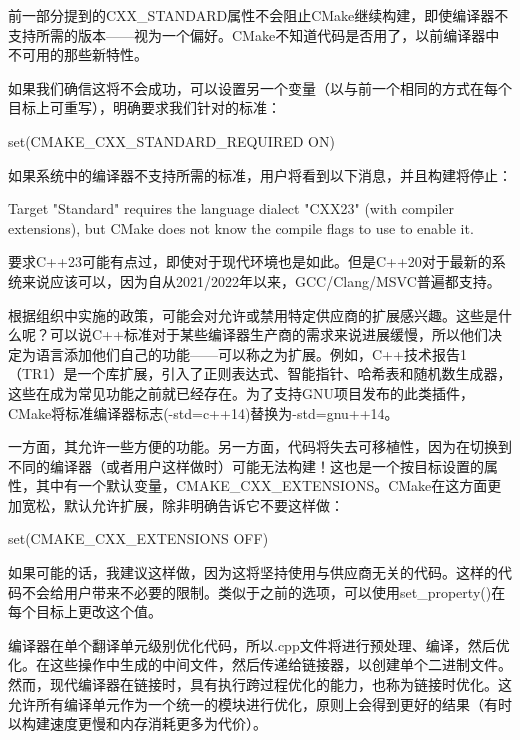 
前一部分提到的CXX\_STANDARD属性不会阻止CMake继续构建，即使编译器不支持所需的版本——视为一个偏好。CMake不知道代码是否用了，以前编译器中不可用的那些新特性。

如果我们确信这将不会成功，可以设置另一个变量（以与前一个相同的方式在每个目标上可重写），明确要求我们针对的标准：

\begin{cmake}
set(CMAKE_CXX_STANDARD_REQUIRED ON)
\end{cmake}

如果系统中的编译器不支持所需的标准，用户将看到以下消息，并且构建将停止：

\begin{shell}
Target "Standard" requires the language dialect "CXX23" (with compiler extensions), but CMake does not know the compile flags to use to enable it.
\end{shell}

要求C++23可能有点过，即使对于现代环境也是如此。但是C++20对于最新的系统来说应该可以，因为自从2021/2022年以来，GCC/Clang/MSVC普遍都支持。


根据组织中实施的政策，可能会对允许或禁用特定供应商的扩展感兴趣。这些是什么呢？可以说C++标准对于某些编译器生产商的需求来说进展缓慢，所以他们决定为语言添加他们自己的功能——可以称之为扩展。例如，C++技术报告1（TR1）是一个库扩展，引入了正则表达式、智能指针、哈希表和随机数生成器，这些在成为常见功能之前就已经存在。为了支持GNU项目发布的此类插件，CMake将标准编译器标志(-std=c++14)替换为-std=gnu++14。

一方面，其允许一些方便的功能。另一方面，代码将失去可移植性，因为在切换到不同的编译器（或者用户这样做时）可能无法构建！这也是一个按目标设置的属性，其中有一个默认变量，CMAKE\_CXX\_EXTENSIONS。CMake在这方面更加宽松，默认允许扩展，除非明确告诉它不要这样做：

\begin{cmake}
set(CMAKE_CXX_EXTENSIONS OFF)
\end{cmake}

如果可能的话，我建议这样做，因为这将坚持使用与供应商无关的代码。这样的代码不会给用户带来不必要的限制。类似于之前的选项，可以使用set\_property()在每个目标上更改这个值。


编译器在单个翻译单元级别优化代码，所以.cpp文件将进行预处理、编译，然后优化。在这些操作中生成的中间文件，然后传递给链接器，以创建单个二进制文件。然而，现代编译器在链接时，具有执行跨过程优化的能力，也称为链接时优化。这允许所有编译单元作为一个统一的模块进行优化，原则上会得到更好的结果（有时以构建速度更慢和内存消耗更多为代价）。

